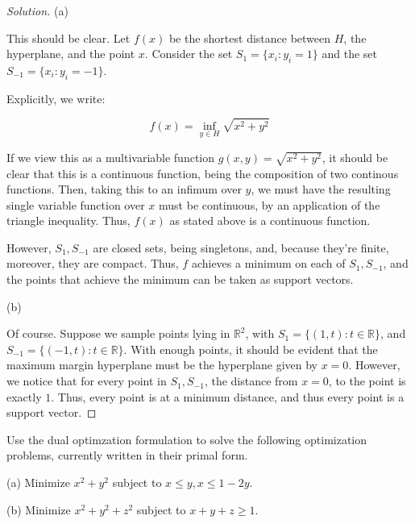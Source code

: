 \documentclass[10pt]{article}
\newenvironment{problem}[2][]{\begin{trivlist}
\item[\hskip \labelsep {\bfseries #1}\hskip \labelsep {\bfseries #2.}]}{\end{trivlist}}
\begin{document}
\begin{proof}[Solution]

(a)

This should be clear. Let $f(x)$ be the shortest distance between $H$, the hyperplane, and the point $x$. Consider the set $S_1 = \{ x_i : y_i = 1 \}$ and the set $S_{-1} = \{ x_i : y_i = -1 \}$.

Explicitly, we write:

$$f(x) = \inf_{y \in H} \sqrt{x^2 + y^2} $$

If we view this as a multivariable function $g(x,y) = \sqrt{x^2 + y^2}$, it should be clear that this is a continuous function, being the composition of two continous functions. Then, taking this to an infimum over $y$, we must have the resulting single variable function over $x$ must be continuous, by an application of the triangle inequality. Thus, $f(x)$ as stated above is a continuous function.

However, $S_1, S_{-1}$ are closed sets, being singletons, and, because they're finite, moreover, they are compact. Thus, $f$ achieves a minimum on each of $S_1, S_{-1}$, and the points that achieve the minimum can be taken as support vectors.

(b)

Of course. Suppose we sample points lying in $\mathbb{R}^2$, with $S_1 = \{ (1,t ) : t \in \mathbb{R} \}$, and $S_{-1} = \{ (-1, t) : t \in \mathbb{R} \}$. With enough points, it should be evident that the maximum margin hyperplane must be the hyperplane given by $x = 0$. However, we notice that for every point in $S_1, S_{-1}$, the distance from $x=0$, to the point is exactly $1$. Thus, every point is at a minimum distance, and thus every point is a support vector.


\end{proof}

\begin{problem}{Question 4}

Use the dual optimzation formulation to solve the following optimization problems, currently written in their primal form.

(a) Minimize $x^2 + y^2$ subject to $x \leq y, x \leq 1 - 2y$.

(b) Minimize $x^2 + y^2 + z^2$ subject to $x + y + z \geq 1$.


\end{problem}
\end{document}
